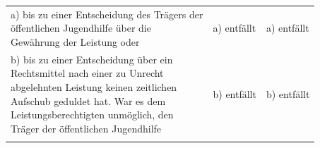 \documentclass[10pt,a4paper,landscape]{article}
\begin{document}
\begin{longtable}{|L{8.2cm}|L{8.2cm}|L{8.2cm}|}
\hhline{|---|}
a)   \newline \textcolor{diffred}{bis zu einer Entscheidung des Trägers der  \newline öffentlichen Jugendhilfe über die  \newline Gewährung der Leistung oder} & a) entfällt & a) entfällt \\
\hhline{|---|}
b)   \newline \textcolor{diffred}{bis zu einer Entscheidung über ein  \newline Rechtsmittel nach einer zu Unrecht  \newline abgelehnten Leistung keinen zeitlichen  \newline Aufschub geduldet hat. War es dem  \newline Leistungsberechtigten unmöglich, den  \newline Träger der öffentlichen Jugendhilfe} & b) entfällt & b) entfällt \\
\hhline{|---|}

\end{longtable}
\end{document}
